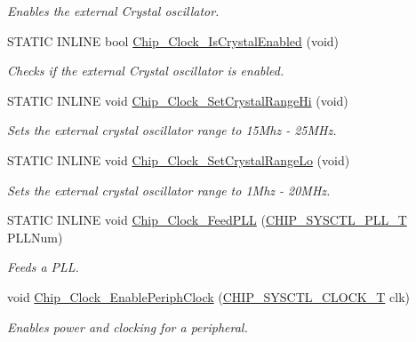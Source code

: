\begin{DoxyCompactItemize}
\begin{DoxyCompactList}\small\item\em Enables the external Crystal oscillator. \end{DoxyCompactList}\item 
S\+T\+A\+T\+I\+C I\+N\+L\+I\+N\+E bool \hyperlink{group___c_l_o_c_k__17_x_x__40_x_x_gaa6cb29b84e27240e44c6ab89775bac97}{Chip\+\_\+\+Clock\+\_\+\+Is\+Crystal\+Enabled} (void)
\begin{DoxyCompactList}\small\item\em Checks if the external Crystal oscillator is enabled. \end{DoxyCompactList}\item 
S\+T\+A\+T\+I\+C I\+N\+L\+I\+N\+E void \hyperlink{group___c_l_o_c_k__17_x_x__40_x_x_ga6887346857de2ee7ec4d0cbc0b8d8396}{Chip\+\_\+\+Clock\+\_\+\+Set\+Crystal\+Range\+Hi} (void)
\begin{DoxyCompactList}\small\item\em Sets the external crystal oscillator range to 15\+Mhz -\/ 25\+M\+Hz. \end{DoxyCompactList}\item 
S\+T\+A\+T\+I\+C I\+N\+L\+I\+N\+E void \hyperlink{group___c_l_o_c_k__17_x_x__40_x_x_ga9d93c4a5c3330839f8813d7d5bb55fd8}{Chip\+\_\+\+Clock\+\_\+\+Set\+Crystal\+Range\+Lo} (void)
\begin{DoxyCompactList}\small\item\em Sets the external crystal oscillator range to 1\+Mhz -\/ 20\+M\+Hz. \end{DoxyCompactList}\item 
S\+T\+A\+T\+I\+C I\+N\+L\+I\+N\+E void \hyperlink{group___c_l_o_c_k__17_x_x__40_x_x_ga4d4cc965838cf2c5cddafd07aa66a790}{Chip\+\_\+\+Clock\+\_\+\+Feed\+P\+L\+L} (\hyperlink{group___s_y_s_c_t_l__17_x_x__40_x_x_ga5f5478a201b021ed04a0724bff524c4b}{C\+H\+I\+P\+\_\+\+S\+Y\+S\+C\+T\+L\+\_\+\+P\+L\+L\+\_\+\+T} P\+L\+L\+Num)
\begin{DoxyCompactList}\small\item\em Feeds a P\+L\+L. \end{DoxyCompactList}\item 
void \hyperlink{group___c_l_o_c_k__17_x_x__40_x_x_gac63024a1f928ba359c4f4cac7e48fe39}{Chip\+\_\+\+Clock\+\_\+\+Enable\+Periph\+Clock} (\hyperlink{group___c_l_o_c_k__17_x_x__40_x_x_ga82e75cbe777e79f448fec3987ddd978e}{C\+H\+I\+P\+\_\+\+S\+Y\+S\+C\+T\+L\+\_\+\+C\+L\+O\+C\+K\+\_\+\+T} clk)
\begin{DoxyCompactList}\small\item\em Enables power and clocking for a peripheral. \end{DoxyCompactList}\item 

\end{DoxyCompactItemize}
